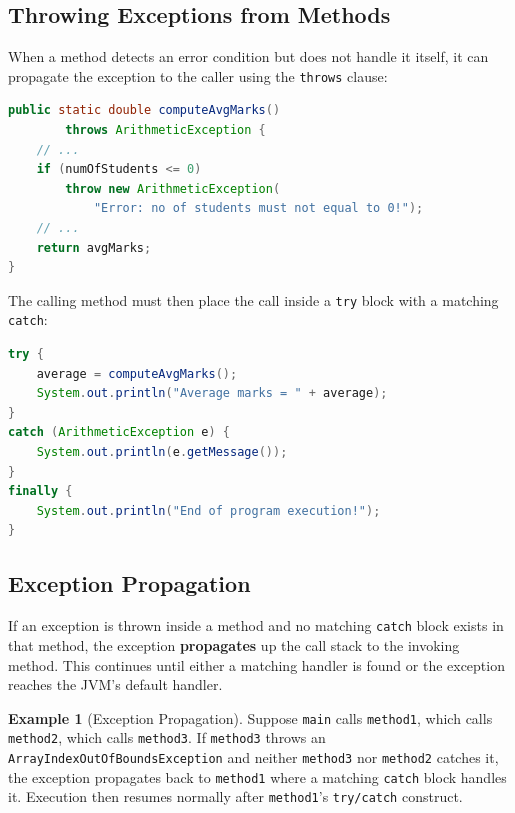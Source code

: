 \documentclass[11pt, a4paper, notitlepage]{report}
\theoremstyle{definition}
\theoremstyle{remark}
\theoremstyle{definition}
\newtheorem{example}[theorem]{Example}
\begin{document}
\subsection{Throwing Exceptions from Methods}
\label{sec:ch4-throws-clause}

When a method detects an error condition but does not handle it itself, it can propagate the exception to the caller using the \texttt{throws} clause:

\begin{lstlisting}[language=Java]
public static double computeAvgMarks()
        throws ArithmeticException {
    // ...
    if (numOfStudents <= 0)
        throw new ArithmeticException(
            "Error: no of students must not equal to 0!");
    // ...
    return avgMarks;
}
\end{lstlisting}

The calling method must then place the call inside a \texttt{try} block with a matching \texttt{catch}:

\begin{lstlisting}[language=Java]
try {
    average = computeAvgMarks();
    System.out.println("Average marks = " + average);
}
catch (ArithmeticException e) {
    System.out.println(e.getMessage());
}
finally {
    System.out.println("End of program execution!");
}
\end{lstlisting}

\subsection{Exception Propagation}
\label{sec:ch4-propagation}

If an exception is thrown inside a method and no matching \texttt{catch} block exists in that method, the exception \textbf{propagates} up the call stack to the invoking method. This continues until either a matching handler is found or the exception reaches the JVM's default handler.

\begin{example}[Exception Propagation]
\label{ex:ch4-propagation}
Suppose \texttt{main} calls \texttt{method1}, which calls \texttt{method2}, which calls \texttt{method3}. If \texttt{method3} throws an \texttt{ArrayIndexOutOfBoundsException} and neither \texttt{method3} nor \texttt{method2} catches it, the exception propagates back to \texttt{method1} where a matching \texttt{catch} block handles it. Execution then resumes normally after \texttt{method1}'s \texttt{try/catch} construct.
\end{example}
\end{document}
